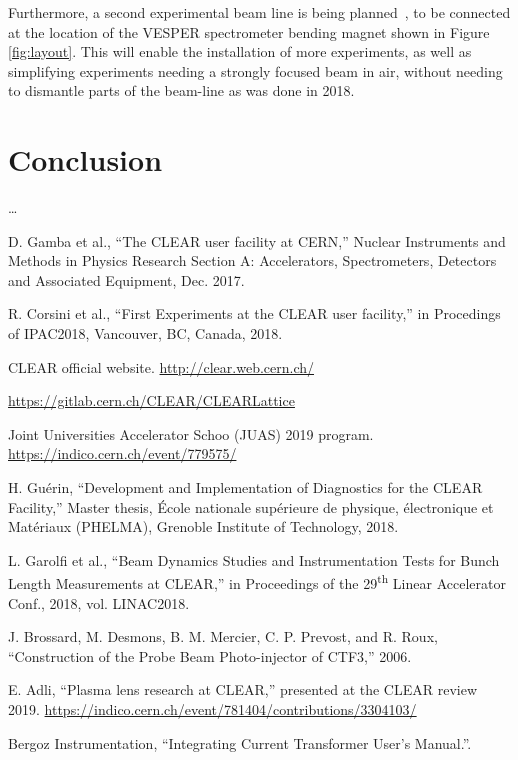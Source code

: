 \documentclass[a4paper,
               keeplastbox,   %
               ]{jacow}
\begin{document}
Furthermore, a second experimental beam line is being planned~\cite{Roberto::CLEARrev}, to be connected at the location of the VESPER spectrometer bending magnet shown in Figure \ref{fig:layout}.
This will enable the installation of more experiments, as well as simplifying experiments needing a strongly focused beam in air, without needing to dismantle parts of the beam-line as was done in 2018.

\section{Conclusion}

\ldots

\begin{thebibliography}{99}
 D. Gamba et al., “The CLEAR user facility at CERN,” Nuclear Instruments and Methods in Physics Research Section A: Accelerators, Spectrometers, Detectors and Associated Equipment, Dec. 2017.

 R. Corsini et al., “First Experiments at the CLEAR user facility,” in Procedings of IPAC2018, Vancouver, BC, Canada, 2018.

 CLEAR official website. \url{http://clear.web.cern.ch/}

 \url{https://gitlab.cern.ch/CLEAR/CLEARLattice}

 Joint Universities Accelerator Schoo (JUAS) 2019 program. \url{https://indico.cern.ch/event/779575/}

 H. Guérin, “Development and Implementation of Diagnostics for the CLEAR Facility,” Master thesis, École nationale supérieure de physique, électronique et Matériaux (PHELMA), Grenoble Institute of Technology, 2018.

 L. Garolfi et al., “Beam Dynamics Studies and Instrumentation Tests for Bunch Length Measurements at CLEAR,” in Proceedings of the 29\textsuperscript{th} Linear Accelerator Conf., 2018, vol. LINAC2018.

 J. Brossard, M. Desmons, B. M. Mercier, C. P. Prevost, and R. Roux, “Construction of the Probe Beam Photo-injector of CTF3,” 2006.

 E. Adli, ``Plasma lens research at CLEAR,'' presented at the CLEAR review 2019. \url{https://indico.cern.ch/event/781404/contributions/3304103/}

 Bergoz Instrumentation, “Integrating Current Transformer User’s Manual.”.


\end{thebibliography}
\end{document}
